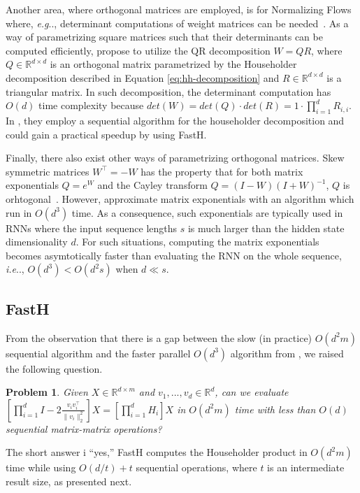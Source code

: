 \documentclass[11pt,a4paper,twoside,openright,final]{memoir}
\makeatletter
\newtheorem{problem}{Problem}
\DeclareRobustCommand\onedot{\futurelet\@let@token\@onedot}
\def\@onedot{\ifx\@let@token.\else.\null\fi\xspace}
\def\eg{\emph{e.g}\onedot} \def\Eg{\emph{E.g}\onedot}
\def\ie{\emph{i.e}\onedot} \def\Ie{\emph{I.e}\onedot}
\makeatother
\begin{document}
Another area, where orthogonal matrices are employed, is for Normalizing Flows where, \eg, determinant computations of weight matrices can be needed~\cite{glow}.
As a way of parametrizing square matrices such that their determinants can be computed efficiently, \citet{emerging} propose to utilize the QR decomposition $W = QR$, where $Q\in\mathbb{R}^{d\times d}$ is an orthogonal matrix parametrized by the Householder decomposition described in Equation \eqref{eq:hh-decomposition} and $R\in\mathbb{R}^{d\times d}$ is a triangular matrix.
In such decomposition, the determinant computation has $O(d)$ time complexity because $det(W) = det(Q) \cdot det(R) =1 \cdot  \prod_{i=1}^d R_{i,i}$. 
In \cite{emerging}, they employ a sequential algorithm for the householder decomposition and could gain a practical speedup by using FastH. 

Finally, there also exist other ways of parametrizing orthogonal matrices.
Skew symmetric matrices $W^\intercal = -W$ has the property that for both matrix exponentials $Q = e^W$ and the Cayley transform $Q=(I-W)(I+W)^{-1}$, $Q$ is orhtogonal~\cite{matrixexp1}. 
However, \citet{matrixexp1} approximate matrix exponentials with an algorithm which run in $O(d^3)$ time.  
As a consequence, such exponentials are typically used in RNNs where the input sequence lengths $s$ is much larger than the hidden state dimensionality $d$.
For such situations, computing the matrix exponentials becomes asymtotically faster than evaluating the RNN on the whole sequence, \ie, $O(d^3) < O(d^2s)$ when $d \ll s$.

\subsection{FastH}\label{sec:fasth}
From the observation that there is a gap between the slow (in practice) $O(d^2m)$ sequential algorithm and the faster parallel $O(d^3)$ algorithm from \cite{sequential}, we raised the following question.

\begin{problem}
    Given $X\in \mathbb{R}^{d\times m}$ and $v_1, ..., v_d \in \mathbb{R}^{d}$, can we evaluate $\left[ \prod_{i=1}^d I-2\frac{v_iv_i^\intercal}{\|v_i\|_2^2}\right]X = \left[\prod_{i=1}^d H_i\right]X$ in $O(d^2m)$ time with less than $O(d)$ sequential matrix-matrix operations?
\end{problem}

The short answer i ``yes,'' FastH computes the Householder product in $O(d^2m)$ time while using $O(d/t) + t$ sequential operations, where $t$ is an intermediate result size, as presented next.
\end{document}
